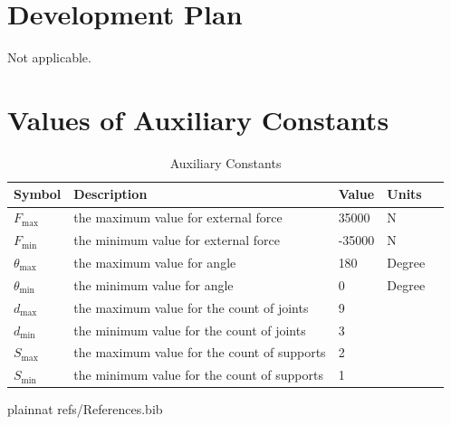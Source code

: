 \documentclass[12pt]{article}
\begin{document}
\section{Development Plan}

Not applicable.


\section{Values of Auxiliary Constants}
\begin{table}[h!]
	\renewcommand{\arraystretch}{1.2}
	\noindent \begin{longtable*}{l l l l c} 
		\toprule
		\textbf{Symbol} & \textbf{Description} & \textbf{Value} & 
		\textbf{Units} \\
		\midrule 
		$F_{\text{max}}$ & the maximum value for external force & 35000 & 
		\si{\newton}\\
		$F_{\text{min}}$ & the minimum value for external force & -35000 & 
		\si{\newton}\\
       	
		$\theta_{\text{max}}$ & the maximum value for angle & 180 & 
		Degree\\
		$\theta_{\text{min}}$ & the minimum value for angle & 0 & 
		Degree\\
  $d_{\text{max}}$ & the maximum value for the count of joints & 9 & 
		\\
		$d_{\text{min}}$ & the minimum value for the count of joints &  3 & \\
  $S_{\text{max}}$ & the maximum value for the count of supports & 2 & 
		\\
		$S_{\text{min}}$ & the minimum value for the count of supports &  1 & 
		\\
		\bottomrule		
	\end{longtable*}
	\caption{Auxiliary Constants} \label{TblAuxConst}
\end{table}



\newpage

 {plainnat}
 {refs/References.bib}
\end{document}
